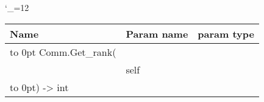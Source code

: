 \begingroup \catcode`\_=12 \tt
\begin{tabular}{lll}
\toprule
\textrm{Name}&\textrm{Param name}&\textrm{param type}\\
\midrule
\hbox to 0pt {Comm.Get_rank(\hss}\\
& self\\
\hbox to 0pt{) -> int\hss}\\
\bottomrule
\end{tabular}
\endgroup
